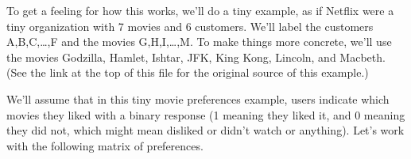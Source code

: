 \documentclass[letterpaper,10pt,english]{jupyterBook}
\begin{document}
\sphinxAtStartPar
To get a feeling for how this works, we’ll do a tiny example, as if Netflix were a tiny organization with 7 movies and 6 customers.  We’ll label the customers A,B,C,…,F and the movies G,H,I,…,M.  To make things more concrete, we’ll use the movies Godzilla, Hamlet, Ishtar, JFK, King Kong, Lincoln, and Macbeth.  (See the link at the top of this file for the original source of this example.)

\sphinxAtStartPar
We’ll assume that in this tiny movie preferences example, users indicate which movies they liked with a binary response (1 meaning they liked it, and 0 meaning they did not, which might mean disliked or didn’t watch or anything).  Let’s work with the following matrix of preferences.

\begin{sphinxVerbatim}[commandchars=\\\{\}]
   


\end{sphinxVerbatim}
\end{document}
